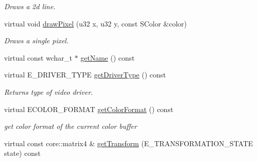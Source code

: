 \begin{DoxyCompactItemize}
\begin{DoxyCompactList}\small\item\em Draws a 2d line. \end{DoxyCompactList}\item 
\hypertarget{classirr_1_1video_1_1_c_software_driver_a85269504de4c24987af67be15088608d}{virtual void \hyperlink{classirr_1_1video_1_1_c_software_driver_a85269504de4c24987af67be15088608d}{draw\-Pixel} (u32 x, u32 y, const S\-Color \&color)}\label{classirr_1_1video_1_1_c_software_driver_a85269504de4c24987af67be15088608d}

\begin{DoxyCompactList}\small\item\em Draws a single pixel. \end{DoxyCompactList}\item 
virtual const wchar\-\_\-t $\ast$ \hyperlink{classirr_1_1video_1_1_c_software_driver_a239d6935765a2860311b7b08a424edf8}{get\-Name} () const 
\item 
\hypertarget{classirr_1_1video_1_1_c_software_driver_ac8dc5a7a189e15f5592ee556c42d7417}{virtual E\-\_\-\-D\-R\-I\-V\-E\-R\-\_\-\-T\-Y\-P\-E \hyperlink{classirr_1_1video_1_1_c_software_driver_ac8dc5a7a189e15f5592ee556c42d7417}{get\-Driver\-Type} () const }\label{classirr_1_1video_1_1_c_software_driver_ac8dc5a7a189e15f5592ee556c42d7417}

\begin{DoxyCompactList}\small\item\em Returns type of video driver. \end{DoxyCompactList}\item 
\hypertarget{classirr_1_1video_1_1_c_software_driver_ab3bf70ce084dbc2a1dbafc17155cf0d2}{virtual E\-C\-O\-L\-O\-R\-\_\-\-F\-O\-R\-M\-A\-T \hyperlink{classirr_1_1video_1_1_c_software_driver_ab3bf70ce084dbc2a1dbafc17155cf0d2}{get\-Color\-Format} () const }\label{classirr_1_1video_1_1_c_software_driver_ab3bf70ce084dbc2a1dbafc17155cf0d2}

\begin{DoxyCompactList}\small\item\em get color format of the current color buffer \end{DoxyCompactList}\item 
\hypertarget{classirr_1_1video_1_1_c_software_driver_a6ea56a7fafbcc2fea36668d750817d04}{virtual const core\-::matrix4 \& \hyperlink{classirr_1_1video_1_1_c_software_driver_a6ea56a7fafbcc2fea36668d750817d04}{get\-Transform} (E\-\_\-\-T\-R\-A\-N\-S\-F\-O\-R\-M\-A\-T\-I\-O\-N\-\_\-\-S\-T\-A\-T\-E state) const }\label{classirr_1_1video_1_1_c_software_driver_a6ea56a7fafbcc2fea36668d750817d04}


\end{DoxyCompactItemize}
